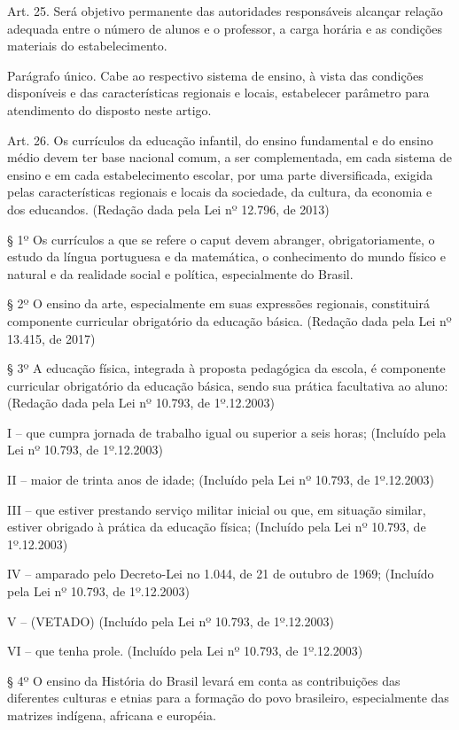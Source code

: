 \documentclass[
]{book}
\begin{document}
Art. 25. Será objetivo permanente das autoridades responsáveis alcançar relação adequada entre o número de alunos e o professor, a carga horária e as condições materiais do estabelecimento.

Parágrafo único. Cabe ao respectivo sistema de ensino, à vista das condições disponíveis e das características regionais e locais, estabelecer parâmetro para atendimento do disposto neste artigo.

Art. 26. Os currículos da educação infantil, do ensino fundamental e do ensino médio devem ter base nacional comum, a ser complementada, em cada sistema de ensino e em cada estabelecimento escolar, por uma parte diversificada, exigida pelas características regionais e locais da sociedade, da cultura, da economia e dos educandos. (Redação dada pela Lei nº 12.796, de 2013)

§ 1º Os currículos a que se refere o caput devem abranger, obrigatoriamente, o estudo da língua portuguesa e da matemática, o conhecimento do mundo físico e natural e da realidade social e política, especialmente do Brasil.

§ 2º O ensino da arte, especialmente em suas expressões regionais, constituirá componente curricular obrigatório da educação básica. (Redação dada pela Lei nº 13.415, de 2017)

§ 3º A educação física, integrada à proposta pedagógica da escola, é componente curricular obrigatório da educação básica, sendo sua prática facultativa ao aluno: (Redação dada pela Lei nº 10.793, de 1º.12.2003)

I -- que cumpra jornada de trabalho igual ou superior a seis horas; (Incluído pela Lei nº 10.793, de 1º.12.2003)

II -- maior de trinta anos de idade; (Incluído pela Lei nº 10.793, de 1º.12.2003)

III -- que estiver prestando serviço militar inicial ou que, em situação similar, estiver obrigado à prática da educação física; (Incluído pela Lei nº 10.793, de 1º.12.2003)

IV -- amparado pelo Decreto-Lei no 1.044, de 21 de outubro de 1969; (Incluído pela Lei nº 10.793, de 1º.12.2003)

V -- (VETADO) (Incluído pela Lei nº 10.793, de 1º.12.2003)

VI -- que tenha prole. (Incluído pela Lei nº 10.793, de 1º.12.2003)

§ 4º O ensino da História do Brasil levará em conta as contribuições das diferentes culturas e etnias para a formação do povo brasileiro, especialmente das matrizes indígena, africana e européia.
\end{document}
